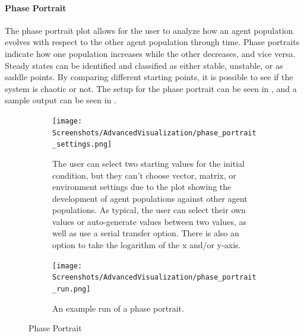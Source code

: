 \paragraph{Phase Portrait}
\label{sec:phase_portrait}
The phase portrait plot allows for the user to analyze how an agent population evolves with respect to the other agent population through time.
Phase portraits indicate how one population increases while the other decreases, and vice versa.
Steady states can be identified and classified as either stable, unstable, or as saddle points.
By comparing different starting points, it is possible to see if the system is chaotic or not.
The setup for the phase portrait can be seen in , and a sample output can be seen in . 

\begin{figure}[!ht]
    \centering
    \begin{subfigure}{0.49\linewidth}
        \centering
        \vspace*{\fill}
        \texttt{[image: Screenshots/AdvancedVisualization/phase\_portrait\_settings.png]}
        \caption{
            The user can select two starting values for the initial condition, but they can't choose vector, matrix, or environment settings due to the plot showing the development of agent populations against other agent populations.
            As typical, the user can select their own values or auto-generate values between two values, as well as use a serial transfer option.
            There is also an option to take the logarithm of the x and/or y-axis. 
        }
        \label{fig:ss:av:phase_portrait_settings}
        \vspace*{\fill}
    \end{subfigure}
    \hfill
    \begin{subfigure}{0.49\linewidth}
        \centering
        \vspace*{\fill}
        \texttt{[image: Screenshots/AdvancedVisualization/phase\_portrait\_run.png]}
        \caption{
            An example run of a phase portrait.
        }
        \label{fig:ss:av:phase_portrait_run}
        \vspace*{\fill}
    \end{subfigure}
    \caption{Phase Portrait}
\end{figure}


